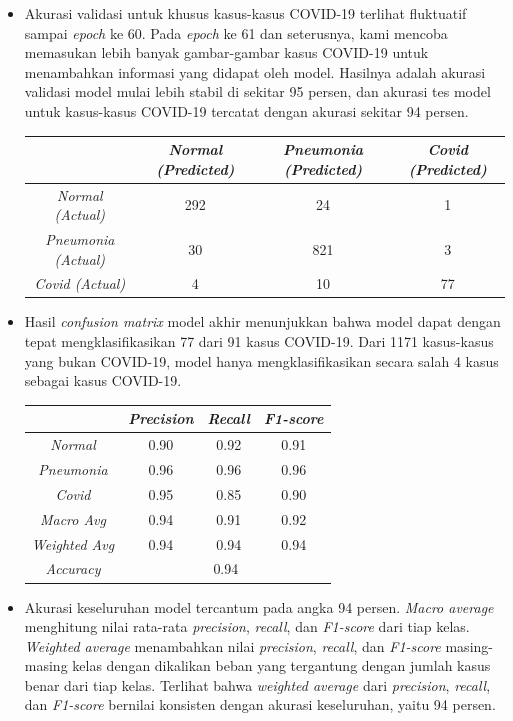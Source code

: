 \documentclass{article}
\begin{document}
\begin{itemize}
		\item Akurasi validasi untuk khusus kasus-kasus COVID-19 terlihat fluktuatif sampai \textit{epoch} ke 60. Pada \textit{epoch} ke 61 dan seterusnya, kami mencoba memasukan lebih banyak gambar-gambar kasus COVID-19 untuk menambahkan informasi yang didapat oleh model. Hasilnya adalah akurasi validasi model mulai lebih stabil di sekitar 95 persen, dan akurasi tes model untuk kasus-kasus COVID-19 tercatat dengan akurasi sekitar 94 persen.
		
		\begin{center}
			\begin{tabular}{|c|c|c|c|}
				\hline
				& \textit{Normal (Predicted)} & \textit{Pneumonia (Predicted)} & \textit{Covid (Predicted)} \\
				\hline
				\textit{Normal (Actual)} & 292 & 24 & 1 \\
				\hline
				\textit{Pneumonia (Actual)} & 30 & 821 & 3 \\
				\hline
				\textit{Covid (Actual)} & 4 & 10 & 77 \\
				\hline
			\end{tabular}
		\end{center}
	
		\item Hasil \textit{confusion matrix} model akhir menunjukkan bahwa model dapat dengan tepat mengklasifikasikan 77 dari 91 kasus COVID-19. Dari 1171 kasus-kasus yang bukan COVID-19, model hanya mengklasifikasikan secara salah 4 kasus sebagai kasus COVID-19. 
	
		\begin{center}
			\begin{tabular}{|c|c|c|c|}
				\hline
				& \textit{Precision} & \textit{Recall} & \textit{F1-score} \\
				\hline
				\textit{Normal} & 0.90 & 0.92 & 0.91 \\
				\hline
				\textit{Pneumonia} & 0.96 & 0.96 & 0.96 \\
				\hline
				\textit{Covid} & 0.95 & 0.85 & 0.90 \\
				\hline
				\hline
				\textit{Macro Avg} & 0.94 & 0.91 & 0.92 \\
				\hline
				\textit{Weighted Avg} & 0.94 & 0.94 & 0.94 \\
				\hline
				\hline
				\textit{Accuracy} & \multicolumn{3}{|c|}{0.94} \\
				\hline
			\end{tabular}
		\end{center}
	
		\item Akurasi keseluruhan model tercantum pada angka 94 persen. \textit{Macro average} menghitung nilai rata-rata \textit{precision}, \textit{recall}, dan \textit{F1-score} dari tiap kelas. \textit{Weighted average} menambahkan nilai \textit{precision}, \textit{recall}, dan \textit{F1-score} masing-masing kelas dengan dikalikan beban yang tergantung dengan jumlah kasus benar dari tiap kelas. Terlihat bahwa \textit{weighted average} dari \textit{precision}, \textit{recall}, dan \textit{F1-score} bernilai konsisten dengan akurasi keseluruhan, yaitu 94 persen.
		
	\end{itemize}
\end{document}
